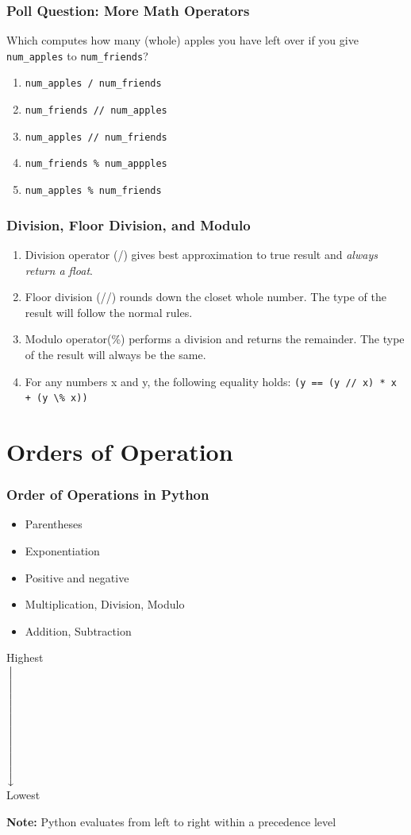 \documentclass{beamer}
\newcommand{\xdownarrow}[1]{%
  {\left\downarrow\vbox to #1{}\right.\kern-\nulldelimiterspace}
}
\begin{document}
%
%
%
\begin{frame}[fragile]
  \frametitle{Poll Question: More Math Operators}
  \vfill
  Which computes how many (whole) apples you have left over if you give \lstinline|num_apples| to \lstinline|num_friends|?
  \begin{enumerate}
    \item \lstinline|num_apples / num_friends|
    \item \lstinline|num_friends // num_apples|
    \item \lstinline|num_apples // num_friends|
    \item \lstinline|num_friends % num_appples|
    \item \lstinline|num_apples % num_friends|
  \end{enumerate}
\end{frame}


%
%
%
\begin{frame}[fragile]
  \frametitle{Division, Floor Division, and Modulo}
  \begin{enumerate}
    \item Division operator (/) gives best approximation to true result and \textit{always return a float}.
    \item Floor division (//) rounds down the closet whole number. The type of the result will follow the normal rules.
    \item Modulo operator(\%) performs a division and returns the remainder. The type of the result will always be the same.
    \item For any numbers x and y, the following equality holds: \lstinline|(y == (y // x) * x + (y \% x))|
  \end{enumerate}
\end{frame}


\section{Orders of Operation}

\begin{frame}
  \frametitle{Order of Operations in Python}
  \centering
  \begin{minipage}{0.49\textwidth}
    \begin{itemize}
      \item Parentheses 
      \item Exponentiation
      \item Positive and negative
      \item Multiplication, Division, Modulo
      \item Addition, Subtraction 
    \end{itemize}
  \end{minipage}
  \begin{minipage}{0.2\textwidth}
    \centering
    Highest\\
    $\xdownarrow{2cm}$\\
    Lowest\\
  \end{minipage}
  \vfill
  \textbf{Note:} Python evaluates from left to right within a precedence level
\end{frame}
\end{document}
